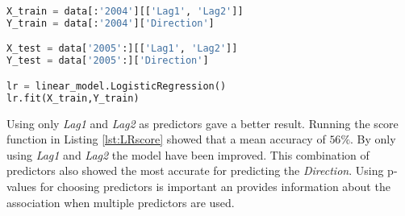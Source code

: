 \begin{lstlisting}[language=Python, label=lst:OnlyLag1Lag2, caption=Logistic regression using only Lag1 and Lag2 as predictors]
X_train = data[:'2004'][['Lag1', 'Lag2']]
Y_train = data[:'2004']['Direction']

X_test = data['2005':][['Lag1', 'Lag2']]
Y_test = data['2005':]['Direction']

lr = linear_model.LogisticRegression()
lr.fit(X_train,Y_train)
\end{lstlisting}

Using only \emph{Lag1} and \emph{Lag2} as predictors gave a better result. Running the score function in Listing \ref{lst:LRscore} showed that a mean accuracy of $56\%$. By only using \emph{Lag1} and \emph{Lag2} the model have been improved. This combination of predictors also showed the most accurate for predicting the \emph{Direction}. Using p-values for choosing predictors is important an provides information about the association when multiple predictors  are used.






